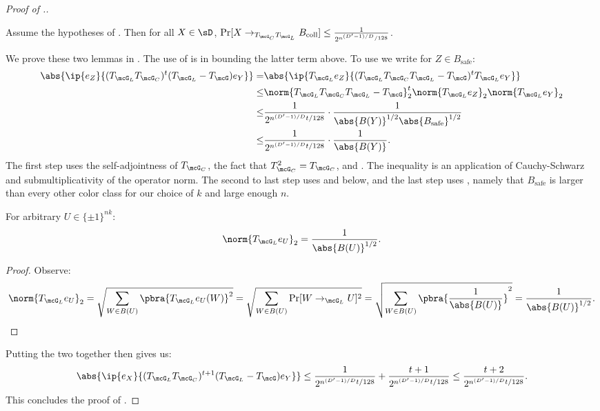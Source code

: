 \begin{proof}[Proof of .]
\begin{lemma}
\label{lem:genlowcollprob}
    Assume the hypotheses of . Then for all $X \in \sD$, $\Pr[X \to_{T_{\mcG_C}T_{\mcG_L}} B_\text{coll}] \leq \frac1{2^{n^{(D'-1)/D}/128}}$.
\end{lemma}
We prove these two lemmas in . The use of  is in bounding the latter term above. To use  we write for $Z \in B_{\mathrm{safe}}$:
\begin{align*}
    \abs{\ip{e_Z}{(T_{\mcG_L}T_{\mcG_C})^t(T_{\mcG_L}-T_{\mcG}) e_Y}} =& \abs{\ip{T_{\mcG_L}e_Z}{(T_{\mcG_L}T_{\mcG_C}T_{\mcG_L}-T_{\mcG})^t T_{\mcG_L} e_Y}} \\
    \leq& \norm{T_{\mcG_L}T_{\mcG_C}T_{\mcG_L}-T_{\mcG}}_{2}^t \norm{T_{\mcG_L}e_Z}_{2} \norm{T_{\mcG_L}e_Y}_{2}\\
    \leq& \frac{1}{2^{n^{(D'-1)/D}t/128}} \cdot \frac{1}{\abs{B(Y)}^{1/2}\abs{B_\text{safe}}^{1/2}}\\
    \leq& \frac{1}{2^{n^{(D'-1)/D}t/128}} \cdot \frac{1}{\abs{B(Y)}}.
\end{align*}
The first step uses the self-adjointness of $T_{\mcG_C}$, the fact that $T_{\mcG_C}^2 = T_{\mcG_C}$, and . The inequality is an application of Cauchy-Schwarz and submultiplicativity of the operator norm. The second to last step uses  and  below, and the last step uses , namely that $B_{\mathrm{safe}}$ is larger than every other color class for our choice of $k$ and large enough $n$.

\begin{claim}\label{TGL eU 2 norm}
    For arbitrary $U \in \{\pm1\}^{nk}$:
\begin{equation*}
    \norm{T_{\mcG_L}e_U}_{2} = \frac{1}{\abs{B(U)}^{1/2}}.
\end{equation*}
\end{claim}

\begin{proof}
    Observe:
    \begin{equation*}
        \norm{T_{\mcG_L}e_U}_{2} = \sqrt{\sum_{W \in B(U)} \pbra{T_{\mcG_L}e_U(W)}^2} = \sqrt{\sum_{W \in B(U)} \Pr[W \to_{\mcG_L} U]^2} = \sqrt{\sum_{W \in B(U)} \pbra{\frac{1}{\abs{B(U)}}}^2} = \frac{1}{\abs{B(U)}^{1/2}}.\qedhere
    \end{equation*}
\end{proof}
Putting the two together then gives us:
\begin{equation*}
    \abs{\ip{e_X}{(T_{\mcG_L}T_{\mcG_C})^{t+1}(T_{\mcG_L}-T_{\mcG}) e_Y}} \leq \frac{1}{2^{n^{(D'-1)/D}t/128}} + \frac{t+1}{2^{n^{(D'-1)/D}t/128}} \leq \frac{t+2}{2^{n^{(D'-1)/D}t/128}}.
\end{equation*}
This concludes the proof of .
\end{proof}

